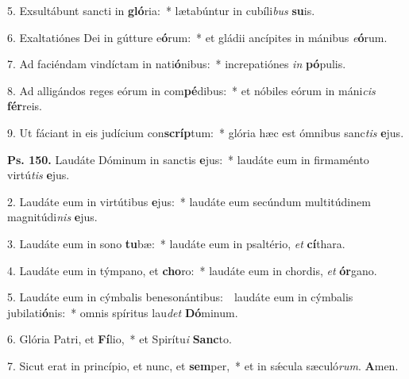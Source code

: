 5. Exsultábunt sancti in \textbf{gló}ria:~* lætabúntur in cubíli\textit{bus} \textbf{su}is.

6. Exaltatiónes Dei in gútture e\textbf{ó}rum:~* et gládii ancípites in mánibus \textit{e}\textbf{ó}rum.

7. Ad faciéndam vindíctam in nati\textbf{ó}nibus:~* increpatiónes \textit{in} \textbf{pó}pulis.

8. Ad alligándos reges eórum in com\textbf{pé}dibus:~* et nóbiles eórum in máni\textit{cis} \textbf{fér}reis.

9. Ut fáciant in eis judícium con\textbf{scríp}tum:~* glória hæc est ómnibus sanc\textit{tis} \textbf{e}jus.

\textbf{Ps. 150.} Laudáte Dóminum in sanctis \textbf{e}jus:~* laudáte eum in firmaménto virtú\textit{tis} \textbf{e}jus.

2. Laudáte eum in virtútibus \textbf{e}jus:~* laudáte eum secúndum multitúdinem magnitúdi\textit{nis} \textbf{e}jus.

3. Laudáte eum in sono \textbf{tu}bæ:~* laudáte eum in psaltério, \textit{et} \textbf{cí}thara.

4. Laudáte eum in týmpano, et \textbf{cho}ro:~* laudáte eum in chordis, \textit{et} \textbf{ór}gano.

5. Laudáte eum in cýmbalis benesonántibus:~\GreDagger\ laudáte eum in cýmbalis jubilati\textbf{ó}nis:~* omnis spíritus lau\textit{det} \textbf{Dó}minum.

6. Glória Patri, et \textbf{Fí}lio,~* et Spirítu\textit{i} \textbf{Sanc}to.

7. Sicut erat in princípio, et nunc, et \textbf{sem}per,~* et in s\'{\ae}cula sæculó\textit{rum}. \textbf{A}men.